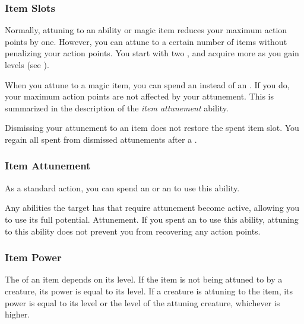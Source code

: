         \subsubsection{Item Slots}\label{Item Slots}
            Normally, attuning to an ability or magic item reduces your maximum action points by one.
            However, you can attune to a certain number of items without penalizing your action points.
            You start with two , and acquire more as you gain levels (see ).

            When you attune to a magic item, you can spend an  instead of an .
            If you do, your maximum action points are not affected by your attunement.
            This is summarized in the description of the \textit{item attunement} ability.

            Dismissing your attunement to an item does not restore the spent item slot.
            You regain all spent  from dismissed attunements after a .

        \subsubsection{Item Attunement}
            As a standard action, you can spend an  or an  to use this ability.
            \begin{ability}
                \begin{spelltargetinginfo}
                \end{spelltargetinginfo}
                \begin{spelleffects}
                    \spelleffect Any abilities the target has that require attunement become active, allowing you to use its full potential.
                    \spelldur Attunement. If you spent an  to use this ability, attuning to this ability does not prevent you from recovering any action points.
                \end{spelleffects}
            \end{ability}

    \subsubsection{Item Power}\label{Item Power}
        The  of an item depends on its level.
        If the item is not being attuned to by a creature, its power is equal to its level.
        If a creature is attuning to the item, its power is equal to its level or the level of the attuning creature, whichever is higher.

